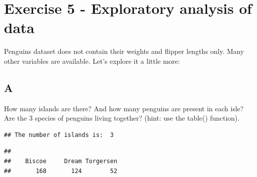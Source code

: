 \documentclass[
]{article}
\newenvironment{Shaded}{\begin{snugshade}}{\end{snugshade}}
\newcommand{\CharTok}[1]{\textcolor[rgb]{0.31,0.60,0.02}{#1}}
\newcommand{\KeywordTok}[1]{\textcolor[rgb]{0.13,0.29,0.53}{\textbf{#1}}}
\newcommand{\NormalTok}[1]{#1}
\newcommand{\OperatorTok}[1]{\textcolor[rgb]{0.81,0.36,0.00}{\textbf{#1}}}
\newcommand{\StringTok}[1]{\textcolor[rgb]{0.31,0.60,0.02}{#1}}
\begin{document}
\hypertarget{exercise-5---exploratory-analysis-of-data}{%
\section{Exercise 5 - Exploratory analysis of
data}\label{exercise-5---exploratory-analysis-of-data}}

Penguins dataset does not contain their weights and flipper lengths
only. Many other variables are available. Let's explore it a little
more:

\hypertarget{a-4}{%
\subsection{A}\label{a-4}}

How many islands are there? And how many penguins are present in each
isle? Are the 3 species of penguins living together? (hint: use the
table() function).

\begin{Shaded}
\end{Shaded}

\begin{verbatim}
## The number of islands is:  3
\end{verbatim}

\begin{Shaded}
\end{Shaded}

\begin{verbatim}
## 
##    Biscoe     Dream Torgersen 
##       168       124        52
\end{verbatim}

\begin{Shaded}
\end{Shaded}
\end{document}
